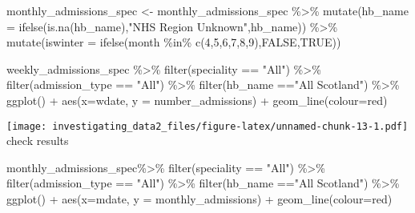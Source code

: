 \documentclass[
]{article}
\newenvironment{Shaded}{\begin{snugshade}}{\end{snugshade}}
\newcommand{\AttributeTok}[1]{\textcolor[rgb]{0.77,0.63,0.00}{#1}}
\newcommand{\ConstantTok}[1]{\textcolor[rgb]{0.00,0.00,0.00}{#1}}
\newcommand{\DecValTok}[1]{\textcolor[rgb]{0.00,0.00,0.81}{#1}}
\newcommand{\FunctionTok}[1]{\textcolor[rgb]{0.00,0.00,0.00}{#1}}
\newcommand{\NormalTok}[1]{#1}
\newcommand{\OtherTok}[1]{\textcolor[rgb]{0.56,0.35,0.01}{#1}}
\newcommand{\SpecialCharTok}[1]{\textcolor[rgb]{0.00,0.00,0.00}{#1}}
\newcommand{\StringTok}[1]{\textcolor[rgb]{0.31,0.60,0.02}{#1}}
\begin{document}
\begin{Shaded}
\begin{Highlighting}[]
\NormalTok{monthly\_admissions\_spec }\OtherTok{\textless{}{-}}\NormalTok{ monthly\_admissions\_spec }\SpecialCharTok{\%\textgreater{}\%} 
  \FunctionTok{mutate}\NormalTok{(}\AttributeTok{hb\_name =} \FunctionTok{ifelse}\NormalTok{(}\FunctionTok{is.na}\NormalTok{(hb\_name),}\StringTok{"NHS Region Unknown"}\NormalTok{,hb\_name)) }\SpecialCharTok{\%\textgreater{}\%} 
  \FunctionTok{mutate}\NormalTok{(}\AttributeTok{iswinter =} \FunctionTok{ifelse}\NormalTok{(month }\SpecialCharTok{\%in\%} \FunctionTok{c}\NormalTok{(}\DecValTok{4}\NormalTok{,}\DecValTok{5}\NormalTok{,}\DecValTok{6}\NormalTok{,}\DecValTok{7}\NormalTok{,}\DecValTok{8}\NormalTok{,}\DecValTok{9}\NormalTok{),}\ConstantTok{FALSE}\NormalTok{,}\ConstantTok{TRUE}\NormalTok{)) }
\end{Highlighting}
\end{Shaded}

\begin{Shaded}
\begin{Highlighting}[]
\NormalTok{weekly\_admissions\_spec }\SpecialCharTok{\%\textgreater{}\%} 
  \FunctionTok{filter}\NormalTok{(speciality }\SpecialCharTok{==} \StringTok{"All"}\NormalTok{) }\SpecialCharTok{\%\textgreater{}\%} 
  \FunctionTok{filter}\NormalTok{(admission\_type }\SpecialCharTok{==} \StringTok{"All"}\NormalTok{) }\SpecialCharTok{\%\textgreater{}\%} 
  \FunctionTok{filter}\NormalTok{(hb\_name }\SpecialCharTok{==}\StringTok{"All Scotland"}\NormalTok{) }\SpecialCharTok{\%\textgreater{}\%} 
\FunctionTok{ggplot}\NormalTok{() }\SpecialCharTok{+}
\FunctionTok{aes}\NormalTok{(}\AttributeTok{x=}\NormalTok{wdate, }\AttributeTok{y =}\NormalTok{ number\_admissions) }\SpecialCharTok{+}
\FunctionTok{geom\_line}\NormalTok{(}\AttributeTok{colour=}\StringTok{\textquotesingle{}red\textquotesingle{}}\NormalTok{) }
\end{Highlighting}
\end{Shaded}

\texttt{[image: investigating\_data2\_files/figure-latex/unnamed-chunk-13-1.pdf]}
check results

\begin{Shaded}
\begin{Highlighting}[]
\NormalTok{monthly\_admissions\_spec}\SpecialCharTok{\%\textgreater{}\%} 
  \FunctionTok{filter}\NormalTok{(speciality }\SpecialCharTok{==} \StringTok{"All"}\NormalTok{) }\SpecialCharTok{\%\textgreater{}\%} 
  \FunctionTok{filter}\NormalTok{(admission\_type }\SpecialCharTok{==} \StringTok{"All"}\NormalTok{) }\SpecialCharTok{\%\textgreater{}\%} 
  \FunctionTok{filter}\NormalTok{(hb\_name }\SpecialCharTok{==}\StringTok{"All Scotland"}\NormalTok{) }\SpecialCharTok{\%\textgreater{}\%} 
\FunctionTok{ggplot}\NormalTok{() }\SpecialCharTok{+}
\FunctionTok{aes}\NormalTok{(}\AttributeTok{x=}\NormalTok{mdate, }\AttributeTok{y =}\NormalTok{ monthly\_admissions) }\SpecialCharTok{+}
\FunctionTok{geom\_line}\NormalTok{(}\AttributeTok{colour=}\StringTok{\textquotesingle{}red\textquotesingle{}}\NormalTok{) }
\end{Highlighting}
\end{Shaded}
\end{document}
